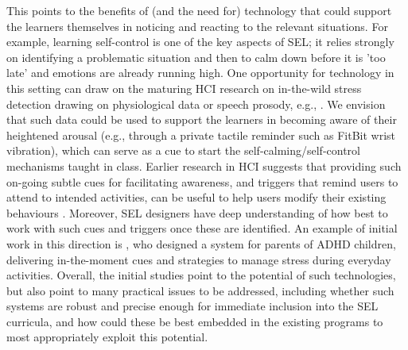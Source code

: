 \documentclass[prodmode,acmtochi]{acmsmall}
\newcommand{\todolater}[1]{}
\newcommand{\rephrase}[1]{\textrm{\textrm{\textcolor{gray}{#1}}}}
\begin{document}
This points to the benefits of (and the need for) technology that could support the learners themselves in noticing and reacting to the relevant situations. For example, learning self-control is one of the key aspects of SEL; it relies strongly on identifying a problematic situation and then to calm down before it is 'too late' and emotions are already running high. One opportunity for technology in this setting can draw on the maturing HCI research on in-the-wild stress detection drawing on physiological data or speech prosody, e.g., \cite{Hernandez2011,Poh2010,Pina2014,Zeng2009,Ertin2011}. We envision that such data could be used to support the learners in becoming aware of their heightened arousal (e.g., through a private tactile reminder such as FitBit wrist vibration), which can serve as a cue to start the self-calming/self-control mechanisms taught in class. Earlier research in HCI suggests that providing such on-going subtle cues for facilitating awareness, and triggers that remind users to attend to intended activities, can be useful to help users modify their existing behaviours \cite{Consolvo2009,Obermair2008}. Moreover, SEL designers have deep understanding of how best to work with such cues and triggers once these are identified. An example of initial work in this direction is , who designed a system for parents of ADHD children, delivering in-the-moment cues and strategies to manage stress during everyday activities.  Overall, the initial studies point to the potential of such technologies, but also point to many practical issues to be addressed, including whether such systems are robust and precise enough for immediate inclusion into the SEL curricula, and how could these be best embedded in the existing programs to most appropriately exploit this potential. 

\todolater{???Other similar opportunities for technology could be in supporting other learned topics such as prompting awareness of own emotions, }



\end{document}
